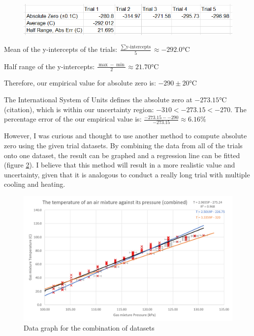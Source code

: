\documentclass[a4paper,12pt]{article}
\begin{document}
\begin{figure}[H]
    \centering
    \includegraphics[scale=0.7]{assets/azerodata.png}
    \label{fig:yi}
\end{figure}


Mean of the y-intercepts of the trials: $\frac{\sum \text{y-intercepts}}{5} \approx -292.0 \si{\celsius}$

Half range of the y-intercepts: $\frac{\max - \min}{2} \approx 21.70 \si{\celsius}$

Therefore, our empirical value for absolute zero is: $-290 \pm 20 \si{\celsius}$

The International System of Units defines the absolute zero at $-273.15\si{\celsius}$ (citation), which is within our uncertainty region: $-310 < -273.15 < -270$. The percentage error of the our empirical value is: $\frac{-273.15- -290}{-273.15} \approx 6.16\%$

However, I was curious and thought to use another method to compute absolute zero using the given trial datasets. By combining the data from all of the trials onto one dataset, the result can be graphed and a regression line can be fitted (figure \ref{fig:comb}). I believe that this method will result in a more realistic value and uncertainty, given that it is analogous to conduct a really long trial with multiple cooling and heating.

\begin{figure}[H]
    \centering
    \includegraphics[width=\textwidth]{assets/combinedgraph.png}
    \caption{Data graph for the combination of datasets}
    \label{fig:comb}
\end{figure}
\end{document}
